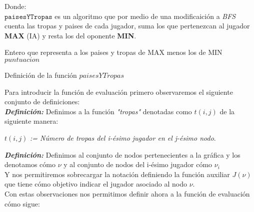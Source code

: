\documentclass[12pt,twocolumn,draft]{article}
\begin{document}
Donde:\\

$\mathtt{paisesYTropas}$ es un algoritmo que por medio de una modificaici\'on a \textit{BFS} cuenta
las tropas y paises de cada jugador, suma los que pertenezcan al jugador \textbf{MAX} (IA) y resta los del oponente 
\textbf{MIN}.\\

\begin{algorithm}
\begin{algorithmic}[1]
\ENSURE Entero que representa a los paises y tropas de MAX menos los de MIN
\ENDFOR
{}
\ENDIF
{}
\ENDIF
{}
\ENDIF
\ENDFOR
\ENDWHILE
\RETURN $puntuacion$
\end{algorithmic}
\caption{Definici\'on de la funci\'on $paisesYTropas$}
\label{paisesYTropas}
\end{algorithm}

Para introducir la funci\'on de evaluaci\'on primero observaremos el siguiente conjunto de definiciones:\\

\textbf{\textit{Definici\'on:}}
Definimos a la funci\'on  \textit{"tropas"} denotadas como 
$t(i,j)$ de la siguiente manera:
\begin{center}
$t(i,j)$ \textit{:= N\'umero de tropas del i-\'esimo  jugador en el j-\'esimo nodo}.\\
\end{center}

\textbf{\textit{Definici\'on:}}
Definimos al conjunto de nodos pertenecientes a la gr\'afica y los denotamos c\'omo $\nu$ y al conjunto de nodos del i-\'esimo jugador c\'omo $\nu_{i}$\\

Y nos permitiremos sobrecargar la notaci\'on definiendo la funci\'on auxiliar $J(\nu)$ que tiene c\'omo objetivo indicar el jugador asociado al nodo $\nu$.\\


Con estas observaciones nos permitimos definir ahora a la funci\'on de evaluaci\'on c\'omo sigue:\\
\end{document}
